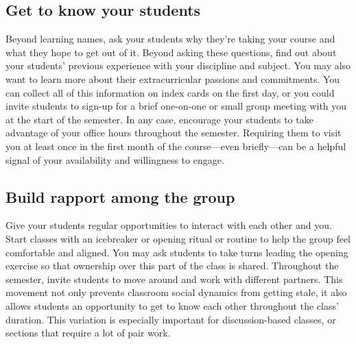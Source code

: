 \subsection{Get to know your students}
\label{sec:get-know-your}

Beyond learning names, ask your students why they’re taking your course and what they hope to get out of it. Beyond asking these questions, find out about your students’ previous experience with your discipline and subject. You may also want to learn more about their extracurricular passions and commitments. You can collect all of this information on index cards on the first day, or you could invite students to sign-up for a brief one-on-one or small group meeting with you at the start of the semester. In any case, encourage your students to take advantage of your office hours throughout the semester. Requiring them to visit you at least once in the first month of the course—even briefly—can be a helpful signal of your availability and willingness to engage.

\subsection{Build rapport among the group}
\label{sec:build-rapport-among}

Give your students regular opportunities to interact with each other and you. Start classes with an icebreaker or opening ritual or routine to help the group feel comfortable and aligned. You may ask students to take turns leading the opening exercise so that ownership over this part of the class is shared. Throughout the semester, invite students to move around and work with different partners. This movement not only prevents classroom social dynamics from getting stale, it also allows students an opportunity to get to know each other throughout the class’ duration. This variation is especially important for discussion-based classes, or sections that require a lot of pair work.




